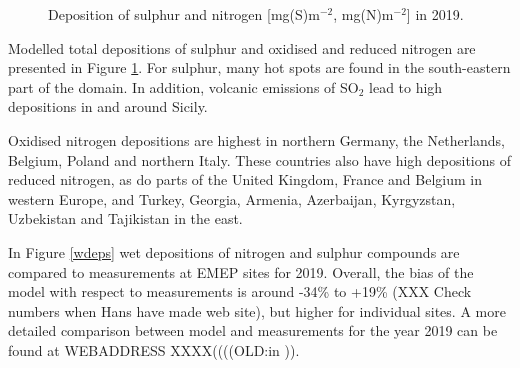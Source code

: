\begin{figure}[H]
 \caption{Deposition of sulphur and nitrogen [mg(S)m$^{-2}$, mg(N)m$^{-2}$] in 2019.}
\label{deps}
\end{figure}

Modelled total depositions of sulphur and oxidised and reduced nitrogen are presented in Figure \ref{deps}.
For sulphur, many hot spots are found in the south-eastern part of the domain. In addition, volcanic emissions of SO$_2$ lead to high depositions in and around Sicily.

Oxidised nitrogen depositions are highest in northern Germany, the Netherlands, Belgium, Poland and northern Italy. These countries also have high depositions of reduced nitrogen, as do parts of the United Kingdom, France and Belgium in western Europe, and Turkey, Georgia, Armenia, Azerbaijan, Kyrgyzstan, Uzbekistan and Tajikistan in the east. 

In Figure \ref{wdeps} wet depositions of nitrogen and sulphur compounds are compared to measurements at EMEP sites for 2019. Overall, the bias of the model with respect to measurements is around 
-34\% to +19\% (XXX Check numbers when Hans have made web site), but higher for individual sites. A more detailed comparison between model and measurements for the year 2019 can be found at WEBADDRESS XXXX((((OLD:in \cite{WEB2020:SN} )).

